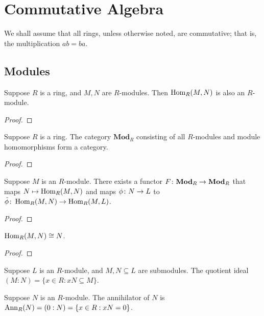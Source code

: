 \chapter{Commutative Algebra}\label{ch:comm-alg}

\begin{remark}
    We shall assume that all rings,
    unless otherwise noted, are commutative;
    that is, the multiplication \(ab = ba\).
\end{remark}


\section{Modules}\label{sec:comm-modules}

\begin{proposition}
    Suppose \(R\) is a ring, and \(M,N\) are \(R\)-modules.
    Then \(\operatorname{Hom}_R(M,N)\) is also an \(R\)-module.
\end{proposition}
\begin{proof}
    
\end{proof}

\begin{proposition}
    Suppose \(R\) is a ring.
    The category \(\textbf{Mod}_R\) consisting of all \(R\)-modules
    and module homomorphisms form a category.
\end{proposition}
\begin{proof}
    
\end{proof}

\begin{proposition}
    Suppose \(M\) is an \(R\)-module.
    There exists a functor \(F\colon\textbf{Mod}_R\to\textbf{Mod}_R\)
    that maps \(N \mapsto \operatorname{Hom}_R(M,N)\)
    and maps \(\phi\colon N\to L\) to \(\tilde{\phi}\colon\operatorname{Hom}_R(M,N)\to\operatorname{Hom}_R(M,L)\).
\end{proposition}
\begin{proof}
    
\end{proof}
\begin{corollary}
    \(\operatorname{Hom}_R(M,N) \cong N\).
\end{corollary}
\begin{proof}
    
\end{proof}

\begin{definition}
    Suppose \(L\) is an \(R\)-module,
    and \(M,N \subseteq L\) are submodules.
    The quotient ideal \((M:N) = \{x \in R : xN \subseteq M\}\).
\end{definition}
\begin{definition}
    Suppose \(N\) is an \(R\)-module.
    The annihilator of \(N\) is \(\operatorname{Ann}_R(N) = (0:N) = \{x \in R : xN = 0\}\).
\end{definition}

